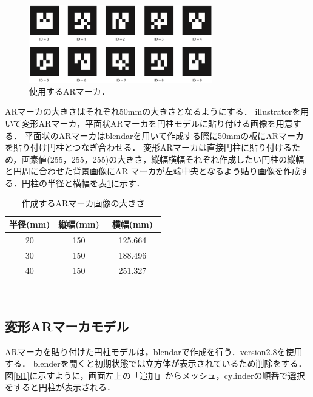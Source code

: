       \begin{figure}[htbp]
      \begin{center}
      \includegraphics[width=80mm]{figure/eps/ARマーカ0～9.eps}
      \caption{使用するARマーカ．}
      \label{09}
      \end{center}
      \end{figure}

ARマーカの大きさはそれぞれ50mmの大きさとなるようにする．
illustratorを用いて変形ARマーカ，平面状ARマーカを円柱モデルに貼り付ける画像を用意する．
平面状のARマーカはblendarを用いて作成する際に50mmの板にARマーカを貼り付け円柱とつなぎ合わせる．
変形ARマーカは直接円柱に貼り付けるため，画素値(255，255，255)の大きさ，縦幅横幅それぞれ作成したい円柱の縦幅と円周に合わせた背景画像にAR マーカが左端中央となるよう貼り画像を作成する．円柱の半径と横幅を表\ref{tab:ARsize}に示す．
\newpage

\begin{table}[h]
  \centering
  \caption{作成するARマーカ画像の大きさ}
    \begin{tabular}{c|c|c} \hline
		半径(mm) & 縦幅(mm) &横幅(mm)　\\ \hline \hline
    	20 & 150 & 125.664 \\ \hline
    	30 & 150 & 188.496 \\ \hline
    	40 & 150 & 251.327 \\ \hline
  \end{tabular}
　\label{tab:ARsize}
\end{table}


\subsection{変形ARマーカモデル}

ARマーカを貼り付けた円柱モデルは，blendar\cite{bl}で作成を行う．version2.8を使用する．
blender\cite{bl}を開くと初期状態では立方体が表示されているため削除をする．
図\ref{bl1}に示すように，画面左上の「追加」からメッシュ，cylinderの順番で選択をすると円柱が表示される．


